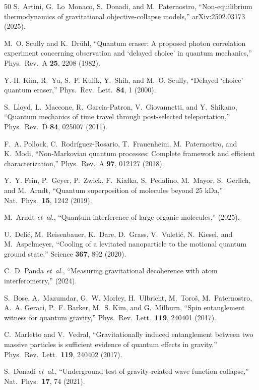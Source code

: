 \documentclass[prl,twocolumn,superscriptaddress,longbibliography,floatfix]{revtex4-2}
\begin{document}
\begin{thebibliography}{50}
S.~Artini, G.~Lo~Monaco, S.~Donadi, and M.~Paternostro,
``Non-equilibrium thermodynamics of gravitational objective-collapse
models,''
arXiv:2502.03173 (2025).

M.~O. Scully and K.~Dr\"uhl,
``Quantum eraser: A proposed photon correlation experiment concerning
observation and `delayed choice' in quantum mechanics,''
Phys.\ Rev.\ A \textbf{25}, 2208 (1982).

Y.-H. Kim, R.~Yu, S.~P. Kulik, Y.~Shih, and M.~O. Scully,
``Delayed `choice' quantum eraser,''
Phys.\ Rev.\ Lett.\ \textbf{84}, 1 (2000).

S.~Lloyd, L.~Maccone, R.~Garcia-Patron, V.~Giovannetti, and
Y.~Shikano,
``Quantum mechanics of time travel through post-selected
teleportation,''
Phys.\ Rev.\ D \textbf{84}, 025007 (2011).

F.~A. Pollock, C.~Rodr\'iguez-Rosario, T.~Frauenheim,
M.~Paternostro, and K.~Modi,
``Non-Markovian quantum processes: Complete framework and efficient
characterization,''
Phys.\ Rev.\ A \textbf{97}, 012127 (2018).

Y.~Y. Fein, P.~Geyer, P.~Zwick, F.~Kia\l{}ka, S.~Pedalino,
M.~Mayor, S.~Gerlich, and M.~Arndt,
``Quantum superposition of molecules beyond 25 kDa,''
Nat.\ Phys.\ \textbf{15}, 1242 (2019).

M.~Arndt \emph{et~al.},
``Quantum interference of large organic molecules,''
(2025).

U.~Deli\'{c}, M.~Reisenbauer, K.~Dare, D.~Grass, V.~Vuleti\'{c},
N.~Kiesel, and M.~Aspelmeyer,
``Cooling of a levitated nanoparticle to the motional quantum ground
state,''
Science \textbf{367}, 892 (2020).

C.~D. Panda \emph{et~al.},
``Measuring gravitational decoherence with atom interferometry,''
(2024).

S.~Bose, A.~Mazumdar, G.~W. Morley, H.~Ulbricht, M.~Toro\v{s},
M.~Paternostro, A.~A. Geraci, P.~F. Barker, M.~S. Kim, and
G.~Milburn,
``Spin entanglement witness for quantum gravity,''
Phys.\ Rev.\ Lett.\ \textbf{119}, 240401 (2017).

C.~Marletto and V.~Vedral,
``Gravitationally induced entanglement between two massive particles
is sufficient evidence of quantum effects in gravity,''
Phys.\ Rev.\ Lett.\ \textbf{119}, 240402 (2017).

S.~Donadi \emph{et~al.},
``Underground test of gravity-related wave function collapse,''
Nat.\ Phys.\ \textbf{17}, 74 (2021).


\end{thebibliography}
\end{document}
